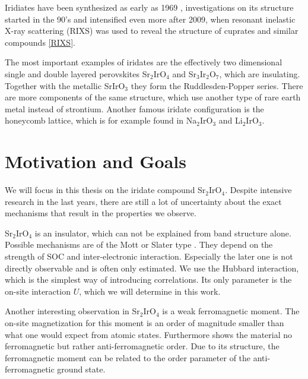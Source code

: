 Iridiates have been synthesized as early as 1969 \cite{Longo1969191}, 
investigations on its structure started in the 90's and intensified 
even more after 2009, when resonant inelastic X-ray scattering (RIXS) was used to 
reveal the structure of cuprates and similar compounds \ref{RIXS}. 


The most important examples of iridates 
are the effectively two dimensional single and double layered perovskites Sr$_2$IrO$_4$ and Sr$_3$Ir$_2$O$_7$, which are insulating.
Together with the metallic SrIrO$_3$ they form the Ruddlesden-Popper series.
There are more components of the same structure, which use another type of rare earth metal instead of strontium. 
Another famous iridate configuration is the honeycomb lattice, which is for example found in Na$_2$IrO$_3$ and Li$_2$IrO$_3$.




%



 






\section{Motivation and Goals}


We will focus in this thesis on the iridate compound Sr$_2$IrO$_4$. 
Despite intensive research in the last years, 
there are still a lot of uncertainty about the exact mechanisms that result in the properties we observe.

Sr$_2$IrO$_4$ is an insulator, which can not be explained from band structure alone. 
Possible mechanisms are of the Mott or Slater type \cite{PhysRevB.89.165115}.
They depend on the strength of SOC and inter-electronic interaction.
Especially the later one is not directly observable and is often only estimated.
We use the Hubbard interaction, which is the simplest way of introducing correlations.
Its only parameter is the on-site interaction $U$, which we will determine in this work.


Another interesting observation in Sr$_2$IrO$_4$ is a weak ferromagnetic moment.
The on-site magnetization for this moment is an order of magnitude smaller than what one would expect from atomic states.
Furthermore shows the material no ferromagnetic but rather anti-ferromagnetic order.
Due to its structure, the ferromagnetic moment can be related to the order parameter of the anti-ferromagnetic ground state.

